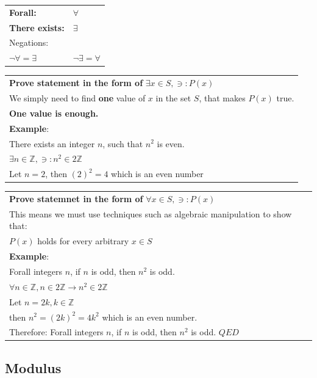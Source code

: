 \documentclass{article}
\begin{document}
\begin{center}
\begin{tabular}{ll}
\textbf{Forall:}& $\forall$\\
\textbf{There exists:}& $\exists$\\
\hline
Negations:\\
$\neg\forall = \exists$ & $\neg\exists = \forall$
\end{tabular}
\vline
\begin{tabular}{l}
\textbf{Prove statement in the form of} $\exists x \in S, \ni: P(x)$\\
We simply need to find \textbf{one} value of $x$ in the set $S$, that makes $P(x)$ true.\\
\textbf{One value is enough.}\\
\hline
\textbf{Example}:\\
There exists an integer $n$, such that $n^2$ is even.\\
$\exists n \in \mathbb Z, \ni: n^2 \in 2 \mathbb Z$\\
Let $n = 2$, then $(2)^2 = 4$ which is an even number
\end{tabular}

\vspace{0.5cm}

\begin{tabular}{l}
\textbf{Prove statemnet in the form of} $\forall x \in S, \ni: P(x)$\\
This means we must use techniques such as algebraic manipulation to show that:\\
$P(x)$ holds for every arbitrary $x \in S$\\
\hline
\textbf{Example}:\\
Forall integers $n$, if $n$ is odd, then $n^2$ is odd.\\
$\forall n \in \mathbb Z, n \in 2 \mathbb Z \rightarrow n^2 \in 2 \mathbb Z$\\
Let $n = 2k, k \in \mathbb Z$\\
then $n^2 = (2k)^2 = 4k^2$ which is an even number.\\
Therefore: Forall integers $n$, if $n$ is odd, then $n^2$ is odd. $QED$
\end{tabular}

\end{center}

\hrulefill

\subsection{Modulus}
\end{document}
